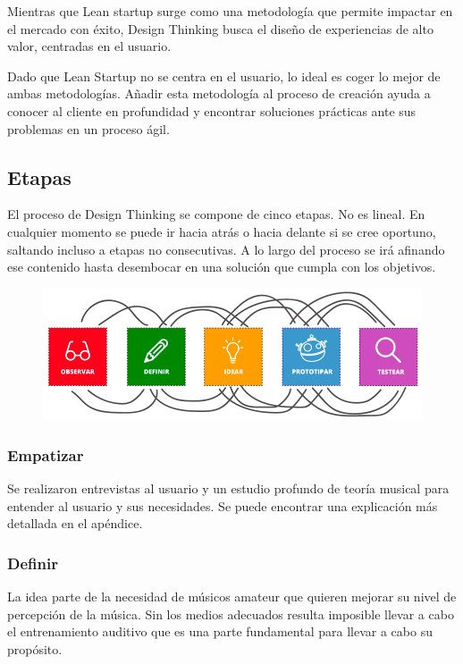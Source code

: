 \documentclass[12pt,twoside,titlepage]{report}
\begin{document}
Mientras que Lean startup surge como una metodología que permite impactar en el mercado con éxito, Design Thinking busca el diseño de experiencias de alto valor, centradas en el usuario.

Dado que Lean Startup no se centra en el usuario, lo ideal es coger lo mejor de ambas metodologías. Añadir esta metodología al proceso de creación ayuda a conocer al cliente en profundidad y encontrar soluciones prácticas ante sus problemas en un proceso ágil.

\subsection{Etapas}

El proceso de Design Thinking se compone de cinco etapas. No es lineal. En cualquier momento se puede ir hacia atrás o hacia delante si se cree oportuno, saltando incluso a etapas no consecutivas. A lo largo del proceso se irá afinando ese contenido hasta desembocar en una solución que cumpla con los objetivos. 

\begin{figure}[H] 
    \includegraphics[scale=0.44]{Design Thinking/Etapas}
    \centering
    \label{fig:Design Thinking}
\end{figure}

\subsubsection{Empatizar}

Se realizaron entrevistas al usuario y un estudio profundo de teoría musical para entender al usuario y sus necesidades. Se puede encontrar una explicación más detallada en el apéndice.
\subsubsection{Definir}

La idea parte de la necesidad de músicos amateur que quieren mejorar su nivel de percepción de la música. Sin los medios adecuados resulta imposible llevar a cabo el entrenamiento auditivo que es una parte fundamental para llevar a cabo su propósito. 
\end{document}
